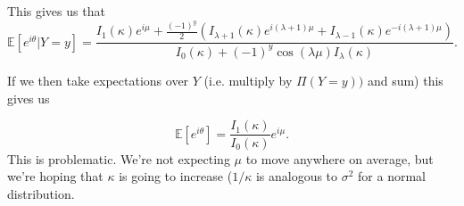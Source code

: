 \documentclass[]{report}
\begin{document}
This gives us that
\[
\mathbb{E}[e^{i \theta} | Y = y] = \frac{ I_1(\kappa) e^{i \mu} + \frac{(-1)^y}{2} \left(I_{\lambda + 1}(\kappa)e^{i(\lambda + 1) \mu}  + I_{\lambda - 1}(\kappa) e^{-i(\lambda + 1)\mu}\right)}{I_0(\kappa) + (-1)^y \cos(\lambda \mu) I_\lambda(\kappa)}.
\]

If we then take expectations over $Y$ (i.e. multiply by $\Pi(Y = y))$ and sum) this gives us

\[
\mathbb{E}[e^{i \theta}] = \frac{I_{1}(\kappa)}{I_0(\kappa)}e^{i \mu}.
\]
This is problematic. We're not expecting $ \mu$ to move anywhere on average, but we're hoping that $\kappa$ is going to increase ($1/ \kappa$ is analogous to $\sigma^2$ for a normal distribution.
\end{document}
